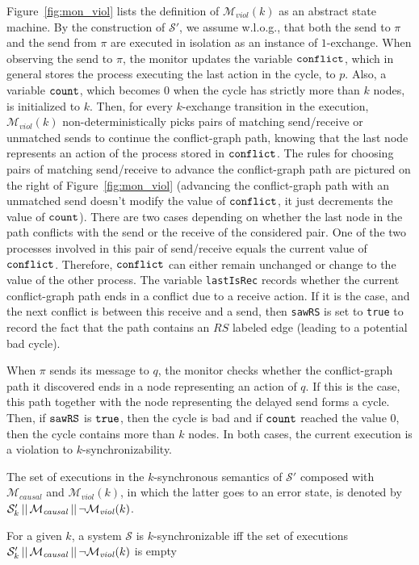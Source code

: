 Figure~\ref{fig:mon_viol} lists the definition of $\mathcal{M}_{\mathit{viol}}(k)$ as an abstract state machine. 
By the construction of $\mathcal{S'}$, we assume w.l.o.g., that both the send to $\pi$ and the send from $\pi$ are executed in isolation as an instance of $1$-exchange.
When observing the send to $\pi$, the monitor updates the variable ${\tt conflict}$, which in general stores the process executing the last action in the cycle, to $p$. Also, a variable ${\tt count}$, which becomes $0$ when the cycle has strictly more than $k$ nodes, is initialized to $k$. 
Then, for every $k$-exchange transition in the execution, $\mathcal{M}_{\mathit{viol}}(k)$ non-deterministically picks pairs of matching send/receive or unmatched sends to continue the conflict-graph path, knowing that the last node represents an action of the process stored in ${\tt conflict}$. The rules for choosing pairs of matching send/receive to advance the conflict-graph path are pictured on the right of Figure~\ref{fig:mon_viol} (advancing the conflict-graph path with an unmatched send doesn't modify the value of ${\tt conflict}$, it just decrements the value of ${\tt count}$). There are two cases depending on whether the last node in the path conflicts with the send or the receive of the considered pair. One of the two processes involved in this pair of send/receive equals the current value of ${\tt conflict}$. Therefore, ${\tt conflict}$ can either remain unchanged or change to the value of the other process. The variable {\tt lastIsRec} records whether the current conflict-graph path ends in a conflict due to a receive action. If it is the case, and the next conflict is between this receive and a send, then {\tt sawRS} is set to {\tt true} to record the fact that the path contains an $RS$ labeled edge (leading to a potential bad cycle).

When $\pi$ sends its message to $q$, the monitor checks whether the conflict-graph path it discovered ends in a node representing an action of $q$. If this is the case, this path together with the node representing the delayed send forms a cycle. Then, if ${\tt sawRS}$ is ${\tt true}$, then the cycle is bad and if ${\tt count}$ reached the value $0$, then the cycle contains more than $k$ nodes. In both cases, the current execution is a violation to $k$-synchronizability.

The set of executions in the $k$-synchronous semantics of $\mathcal{S}'$ composed with $\mathcal{M}_{\mathit{causal}}$ and $\mathcal{M}_{\mathit{viol}}(k)$, in which the latter goes to an error state, is denoted by $\mathcal{S}_k' \,||\,\mathcal{M}_{\mathit{causal}}\,||\, \neg \mathcal{M}_{\mathit{viol}}(k)$.

\vspace{-.5mm}
\begin{theorem}\label{th:main-verif}
For a given $k$, a system $\mathcal{S}$ is $k$-synchronizable iff the set of executions
$
\mathcal{S}_k' \,||\,\mathcal{M}_{\mathit{causal}}\,||\, \neg \mathcal{M}_{\mathit{viol}}(k)
$
is empty
\vspace{-1mm}
\end{theorem}









